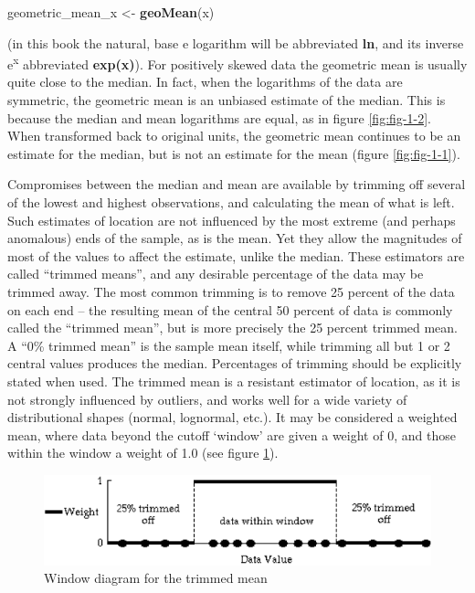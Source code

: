\documentclass[]{book}
\newenvironment{Shaded}{\begin{snugshade}}{\end{snugshade}}
\newcommand{\KeywordTok}[1]{\textcolor[rgb]{0.13,0.29,0.53}{\textbf{#1}}}
\newcommand{\NormalTok}[1]{#1}
\newcommand{\StringTok}[1]{\textcolor[rgb]{0.31,0.60,0.02}{#1}}
\begin{document}
\begin{Shaded}
\begin{Highlighting}[]
\NormalTok{geometric_mean_x <-}\StringTok{ }\KeywordTok{geoMean}\NormalTok{(x)}
\end{Highlighting}
\end{Shaded}

(in this book the natural, base e logarithm will be abbreviated \textbf{ln}, and its inverse e\textsuperscript{x} abbreviated \textbf{exp(x)}). For positively skewed data the geometric mean is usually quite close to the median. In fact, when the logarithms of the data are symmetric, the geometric mean is an unbiased estimate of the median. This is because the median and mean logarithms are equal, as in figure \ref{fig:fig-1-2}. When transformed back to original units, the geometric mean continues to be an estimate for the median, but is not an estimate for the mean (figure \ref{fig:fig-1-1}).

Compromises between the median and mean are available by trimming off several of the lowest and highest observations, and calculating the mean of what is left. Such estimates of location are not influenced by the most extreme (and perhaps anomalous) ends of the sample, as is the mean. Yet they allow the magnitudes of most of the values to affect the estimate, unlike the median. These estimators are called ``trimmed means'', and any desirable percentage of the data may be trimmed away. The most common trimming is to remove 25 percent of the data on each end -- the resulting mean of the central 50 percent of data is commonly called the ``trimmed mean'', but is more precisely the 25 percent trimmed mean. A ``0\% trimmed mean'' is the sample mean itself, while trimming all but 1 or 2 central values produces the median. Percentages of trimming should be explicitly stated when used. The trimmed mean is a resistant estimator of location, as it is not strongly influenced by outliers, and works well for a wide variety of distributional shapes (normal, lognormal, etc.). It may be considered a weighted mean, where data beyond the cutoff `window' are given a weight of 0, and those within the window a weight of 1.0 (see figure \ref{fig:fig-1-4}).

\begin{figure}

{\centering \includegraphics{figures/1_4} 

}

\caption{Window diagram for the trimmed mean}\label{fig:fig-1-4}
\end{figure}
\end{document}
